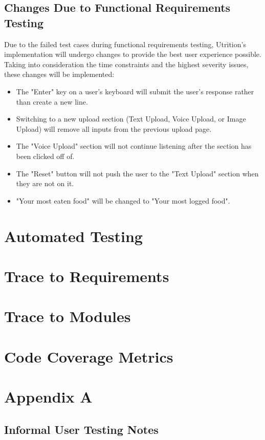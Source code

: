 \documentclass[12pt, titlepage]{article}
\begin{document}
	\subsection{Changes Due to Functional Requirements Testing}
	Due to the failed test cases during functional requirements testing, Utrition's implementation will undergo changes to provide the best user experience possible. Taking into consideration the time constraints and the highest severity issues, these changes will be implemented:
	\begin{itemize}
		\item The "Enter" key on a user's keyboard will submit the user's response rather than create a new line.
		\item Switching to a new upload section (Text Upload, Voice Upload, or Image Upload) will remove all inputs from the previous upload page. 
		\item The "Voice Upload" section will not continue listening after the section has been clicked off of.
		\item The "Reset" button will not push the user to the "Text Upload" section when they are not on it.
		\item "Your most eaten food" will be changed to "Your most logged food".
	\end{itemize}		

	\section{Automated Testing}
	
	\section{Trace to Requirements}
	
	\section{Trace to Modules}		
	
	\section{Code Coverage Metrics}
	
	\section*{Appendix A}
	\subsection*{Informal User Testing Notes}
\end{document}

